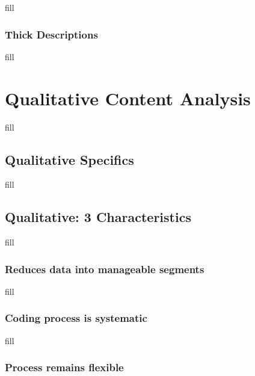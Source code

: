 \documentclass[
  b5paper]{book}
\begin{document}
fill

\hypertarget{thick-descriptions}{%
\subsection*{Thick Descriptions}\label{thick-descriptions}}

fill

\hypertarget{qualitative-content-analysis-1}{%
\chapter{Qualitative Content Analysis}\label{qualitative-content-analysis-1}}

fill

\hypertarget{qualitative-specifics}{%
\section{Qualitative Specifics}\label{qualitative-specifics}}

fill

\hypertarget{qualitative-3-characteristics}{%
\section{Qualitative: 3 Characteristics}\label{qualitative-3-characteristics}}

fill

\hypertarget{reduces-data-into-manageable-segments}{%
\subsection*{Reduces data into manageable segments}\label{reduces-data-into-manageable-segments}}

fill

\hypertarget{coding-process-is-systematic}{%
\subsection*{Coding process is systematic}\label{coding-process-is-systematic}}

fill

\hypertarget{process-remains-flexible}{%
\subsection*{Process remains flexible}\label{process-remains-flexible}}
\end{document}
